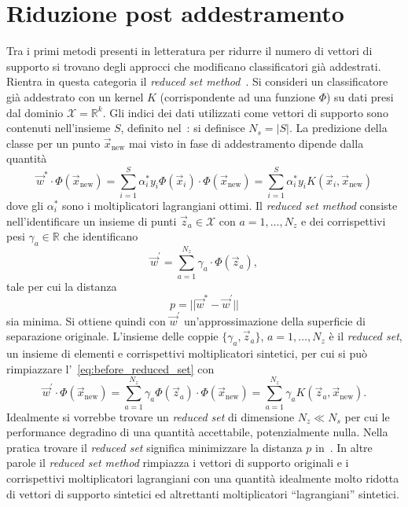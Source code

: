 \section{Riduzione post addestramento}\label{sec:sparsesvm:post_processing}
Tra i primi metodi presenti in letteratura per ridurre il numero di vettori di supporto si trovano degli approcci che modificano classificatori già addestrati. 
Rientra in questa categoria il \emph{reduced set method}~\cite{reduced_set_method}.
Si consideri un classificatore già addestrato con un kernel $K$ (corrispondente ad una funzione $\Phi$) su dati presi dal dominio $\mathcal{X}=\mathbb{R}^k$. Gli indici dei dati utilizzati come vettori di supporto sono contenuti nell'insieme $S$, definito nel~: si definisce $N_s=|S|$. 
La predizione della classe per un punto $\Vec{x}_\text{new}$ mai visto in fase di addestramento dipende dalla quantità
\begin{equation}\label{eq:before_reduced_set}
\Vec{w}^*\cdot\Phi(\Vec{x}_\text{new}) = \sum_{i=1}^{S} \alpha^*_iy_i\Phi(\Vec{x}_i) \cdot \Phi(\Vec{x}_\text{new}) = \sum_{i=1}^{S} \alpha^*_iy_iK(\Vec{x}_i, \Vec{x}_\text{new})
\end{equation}
dove gli $\alpha^*_i$ sono i moltiplicatori lagrangiani ottimi. 
Il \emph{reduced set method} consiste nell'identificare un insieme di punti $\Vec{z}_a \in \mathcal{X}$ con $a=1,\dots,N_z$ e dei corrispettivi pesi $\gamma_a \in \mathbb{R}$ che identificano 
\begin{equation*}
    \Vec{w}^{'} = \sum_{a=1}^{N_z}\gamma_a\cdot\Phi(\Vec{z}_a),
\end{equation*} 
tale per cui la distanza 
\begin{equation}\label{eq:reduced_set_p_distance}
    p = ||\Vec{w}^*-\Vec{w}^{'}||
\end{equation} 
sia minima. Si ottiene quindi con $\Vec{w}^{'}$ un'approssimazione della superficie di separazione originale.
L'insieme delle coppie $\{\gamma_a, \Vec{z}_a\}$, $a=1,\dots, N_z$ è il \emph{reduced set}, un insieme di elementi e corrispettivi moltiplicatori sintetici, per cui si può rimpiazzare l'~\cref{eq:before_reduced_set} con 
\begin{equation}\label{eq:reduced_set}
\Vec{w}^{'} \cdot \Phi(\Vec{x}_\text{new}) = \sum_{a=1}^{N_z}\gamma_a \Phi(\Vec{z}_a) \cdot \Phi(\Vec{x}_\text{new}) = \sum_{a=1}^{N_z}\gamma_a K(\Vec{z}_a, \Vec{x}_\text{new}).
\end{equation}
Idealmente si vorrebbe trovare un \emph{reduced set} di dimensione $N_z \ll N_s$ per cui le performance degradino di una quantità accettabile, potenzialmente nulla.
Nella pratica trovare il \emph{reduced set} significa minimizzare la distanza $p$ in~. 
In altre parole il \emph{reduced set method} rimpiazza i vettori di supporto originali e i corrispettivi moltiplicatori lagrangiani con una quantità idealmente molto ridotta di vettori di supporto sintetici ed altrettanti moltiplicatori ``lagrangiani'' sintetici. 

